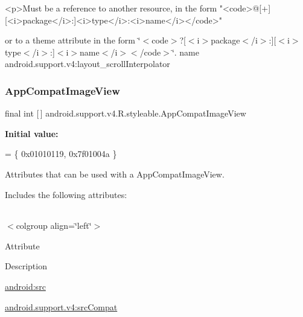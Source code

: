 \begin{DoxyVerb}      <p>Must be a reference to another resource, in the form "<code>@[+][<i>package</i>:]<i>type</i>:<i>name</i></code>"
\end{DoxyVerb}
 or to a theme attribute in the form \char`\"{}$<$code$>$?\mbox{[}$<$i$>$package$<$/i$>$\+:\mbox{]}\mbox{[}$<$i$>$type$<$/i$>$\+:\mbox{]}$<$i$>$name$<$/i$>$$<$/code$>$\char`\"{}.  name android.\+support.\+v4\+:layout\+\_\+scroll\+Interpolator \mbox{\label{classandroid_1_1support_1_1v4_1_1R_1_1styleable_a4d9bb42e7947f32882ba5a45bc43a0a1}} 
\subsubsection{\texorpdfstring{App\+Compat\+Image\+View}{AppCompatImageView}}
{\footnotesize\ttfamily final int \mbox{[}$\,$\mbox{]} android.\+support.\+v4.\+R.\+styleable.\+App\+Compat\+Image\+View\hspace{0.3cm}{\ttfamily [static]}}

{\bfseries Initial value\+:}
\begin{DoxyCode}
= \{
            0x01010119, 0x7f01004a
        \}
\end{DoxyCode}
Attributes that can be used with a App\+Compat\+Image\+View. 

Includes the following attributes\+:

\tabulinesep=1mm
\begin{longtabu} spread 0pt [c]{*{0}{|X[-1]}|}
\hline
\end{longtabu}
$<$colgroup align=\char`\"{}left\char`\"{}$>$ 

Attribute

Description 

{\ttfamily \hyperlink{classandroid_1_1support_1_1v4_1_1R_1_1styleable_a2eb2724fb5893dd2a8a334066b964f2d}{android\+:src}}

{\ttfamily \hyperlink{classandroid_1_1support_1_1v4_1_1R_1_1styleable_ae18967a7ec03c0b47f1a1f8a1eb6c4fa}{android.\+support.\+v4\+:src\+Compat}}

